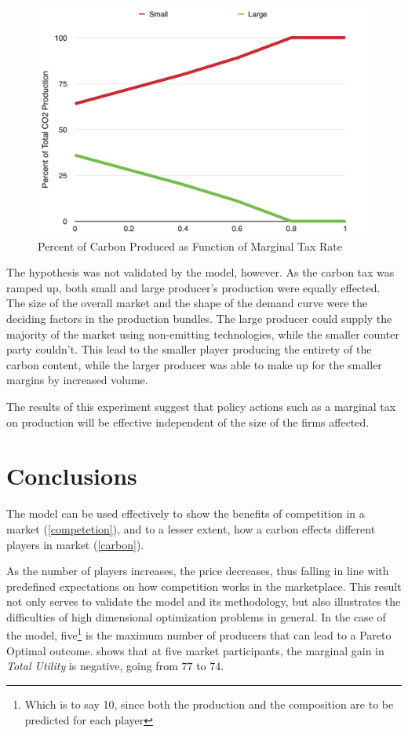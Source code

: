 \documentclass[12pt]{article}
\begin{document}
\begin{figure}[ht!]
	\begin{center}
	\includegraphics[scale=.4]{CO2_percent.png}
	\caption{Percent of Carbon Produced as Function of Marginal Tax Rate}
	\label{co2percent}
	\end{center}
\end{figure}

The hypothesis was not validated by the model, however. As the carbon tax was ramped up, both small and large producer's production were equally effected. The size of the overall market and the shape of the demand curve were the deciding factors in the production bundles. The large producer could supply the majority of the market using non-emitting technologies, while the smaller counter party couldn't. This lead to the smaller player producing the entirety of the carbon content, while the larger producer was able to make up for the smaller margins by increased volume. 

The results of this experiment suggest that policy actions such as a marginal tax on production will be effective independent of the size of the firms affected. 


\section{Conclusions}
The model can be used effectively to show the benefits of competition in a market (\cref{competetion}), and to a lesser extent, how a carbon effects different players in market (\cref{carbon}). \*

As the number of players increases, the price decreases, thus falling in line with predefined expectations on how competition works in the marketplace. This result not only serves to validate the model and its methodology, but also illustrates the difficulties of high dimensional optimization problems in general. In the case of the model, five\footnote{Which is to say 10, since both the production and the composition are to be predicted for each player} is the maximum number of producers that can lead to a Pareto Optimal outcome.  shows that at five market participants, the marginal gain in \emph{Total Utility} is negative, going from $77$ to $74$. 
\end{document}
